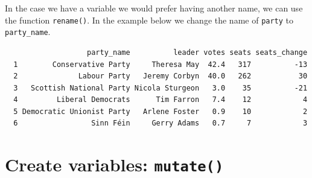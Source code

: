 \documentclass[12pt,oneside]{reedthesis}
\theoremstyle{definition}
\theoremstyle{definition}
\theoremstyle{definition}
\theoremstyle{remark}
\begin{document}
  In the case we have a variable we would prefer having another name, we
  can use the function \texttt{rename()}. In the example below we change
  the name of \texttt{party} to \texttt{party\_name}.
  \begin{Shaded}
  \begin{Highlighting}[]
  \end{Highlighting}
  \end{Shaded}
  \begin{verbatim}
                   party_name          leader votes seats seats_change
  1        Conservative Party     Theresa May  42.4   317          -13
  2              Labour Party   Jeremy Corbyn  40.0   262           30
  3   Scottish National Party Nicola Sturgeon   3.0    35          -21
  4         Liberal Democrats      Tim Farron   7.4    12            4
  5 Democratic Unionist Party   Arlene Foster   0.9    10            2
  6                 Sinn Féin     Gerry Adams   0.7     7            3
  \end{verbatim}
  \section{\texorpdfstring{Create variables:
  \texttt{mutate()}}{Create variables: mutate()}}\label{create-variables-mutate}
  
\end{document}
